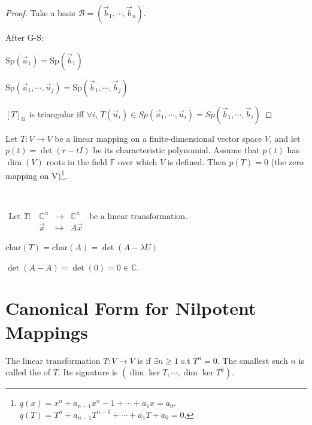 \documentclass[11pt,fleqn]{book} %
\begin{document}
\begin{proof}
    Take a basis $\mathcal{B} = (\vec{b}_1, \cdots, \vec{b}_n)$.

    After G-S:

    $\mathrm{Sp}(\vec{u}_1) = \mathrm{Sp}(\vec{b}_1)$

    $\mathrm{Sp}(\vec{u}_1, \cdots, \vec{u}_j) = \mathrm{Sp}(\vec{b}_1, \cdots, \vec{b}_j)$

    $[T]_\mathcal{U}$ is triangular iff $\forall i$, $T(\vec{u}_i)\in Sp(\vec{u}_1, \cdots, \vec{u}_i) = Sp(\vec{b}_1, \cdots, \vec{b}_i)$
\end{proof}

\setcounter{chapter}{6}
\setcounter{dummy}{11}
\begin{theorem}
    Let $T: V \to V$ be a linear mapping on a finite-dimensional vector space $V$, and let $p(t) = \det(r - tI)$ be its characteristic polynomial. Assume that $p(t)$ has $\dim(V)$ roots in the field $\mathbb{F}$ over which $V$ is defined. Then $p(T) = 0$ (the zero mapping on V)\footnote{$q(x) = x^n + a_{n-1}x^n-1 + \cdots +a_1x = a_0$. $q(T) = T^n + a_{n-1}T^{n-1}+\cdots+a_1T + a_0 = 0$. }.
\end{theorem}
\setcounter{chapter}{4}

\begin{example}
{~~~}

    $\begin{matrix}\text{Let } T: &\mathbb{C}^n &\to &\mathbb{C}^n &\text{be a linear transformation. }\\ &\vec{x} &\mapsto &A\vec{x} \end{matrix}$

    $\mathrm{char}(T) = \mathrm{char}(A) = \det(A - \lambda U)$

    $\det(A - A) = \det(0) = 0 \in \mathbb{C}$.
\end{example}

\section{Canonical Form for Nilpotent Mappings}
\setcounter{section}{0}
\begin{definition}[Niplotent]
    The linear transformation $T: V \to V$ is  if $\exists n \ge 1$ s.t $T^n = 0$. The smallest such $n$ is called the  of $T$. Its signature is $(\dim \ker T, \cdots, \dim\ker T^k)$.
\end{definition}
\setcounter{section}{2}
\end{document}
